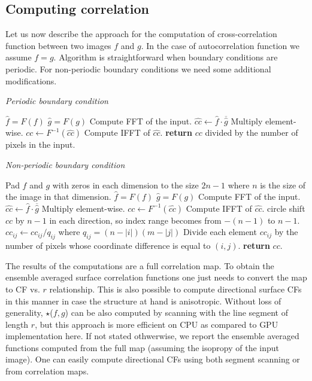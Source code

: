 \documentclass[reprint,amsmath,amssymb,aps,pre,showkeys,showpacs]{revtex4-1}
\begin{document}
\subsection{Computing correlation}
\label{sec:cross-comp}
Let us now describe the approach for the computation of cross-correlation
function between two images $f$ and $g$. In the case of autocorrelation function
we assume $f = g$. Algorithm is straightforward when boundary conditions are
periodic. For non-periodic boundary conditions we need some additional
modifications.

\textit{Periodic boundary condition}
\begin{algorithmic}[1]
  \State $\hat{f} = F(f)$
  \State $\hat{g} = F(g)$
  \Comment Compute FFT of the input.
  \State $\hat{cc} \gets \hat{f} \cdot \overline{\hat{g}}$
  \Comment Multiply element-wise.
  \State $cc \gets F^{-1}(\hat{cc})$
  \Comment Compute IFFT of $\hat{cc}$.
  \State \textbf{return} $cc$ divided by the number of pixels in the input.
  \EndProcedure
\end{algorithmic}

\textit{Non-periodic boundary condition}
\begin{algorithmic}[1]
  \State Pad $f$ and $g$ with zeros in each dimension to the size $2n-1$ where
  $n$ is the size of the image in that dimension.
  \State $\hat{f} = F(f)$
  \State $\hat{g} = F(g)$
  \Comment Compute FFT of the input.
  \State $\hat{cc} \gets \hat{f} \cdot \overline{\hat{g}}$
  \Comment Multiply element-wise.
  \State $cc \gets F^{-1}(\hat{cc})$
  \Comment Compute IFFT of $\hat{cc}$.
  \State circle shift $cc$ by $n - 1$ in each direction, so index range becomes
  from $-(n - 1)$ to $n - 1$.
  \State $cc_{ij} \gets cc_{ij} / q_{ij}$ where $q_{ij} = (n - |i|)(m - |j|)$
  \Comment Divide each element $cc_{ij}$ by the number of pixels whose
  coordinate difference is equal to $(i, j)$.
  \State \textbf{return} $cc$.
  \EndProcedure
\end{algorithmic}

The results of the computations are a full correlation map. To obtain the
ensemble averaged surface correlation functions one just needs to convert the
map to CF vs. $r$ relationship. This is also possible to compute directional
surface CFs in this manner in case the structure at hand is anisotropic. Without
loss of generality, $\star$($f, g$) can be also computed by scanning with the
line segment of length $r$, but this approach is more efficient on CPU as
compared to GPU implementation here. If not stated othwerwise, we report the
ensemble averaged functions computed from the full map (assuming the isopropy of
the input image). One can easily compute directional CFs
\cite{jiao2014chawla,EPL1} using both segment scanning or from correlation maps.
\end{document}
